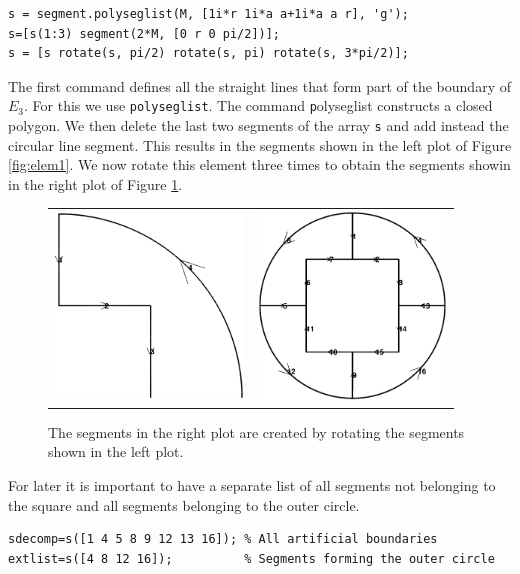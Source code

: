\begin{verbatim}
s = segment.polyseglist(M, [1i*r 1i*a a+1i*a a r], 'g');
s=[s(1:3) segment(2*M, [0 r 0 pi/2])];
s = [s rotate(s, pi/2) rotate(s, pi) rotate(s, 3*pi/2)];
\end{verbatim}
The first command defines all the straight lines that form part of the
boundary of $E_3$. For this we use {\texttt{polyseglist}}. The command
{\texttt polyseglist} constructs a closed polygon. We then delete the
last two segments of the array {\texttt s} and add instead the
circular line segment. This results in the segments shown in the left
plot of Figure \ref{fig:elem1}. We now rotate this element three times to
obtain the segments showin in the right plot of Figure \ref{fig:circelem}.
\begin{figure}
\begin{tabular}{cc}
\includegraphics[width=5cm]{circelem1} &
\includegraphics[width=5cm]{circelem2}
\end{tabular}
\caption{The segments in the right plot are created by rotating the segments
  shown in the left plot.}
\label{fig:circelem}
\end{figure}

For later it is important to have a separate list of all segments not
belonging to the square and all segments belonging to the outer
circle.

\begin{verbatim}
sdecomp=s([1 4 5 8 9 12 13 16]); % All artificial boundaries
extlist=s([4 8 12 16]);          % Segments forming the outer circle
\end{verbatim}


